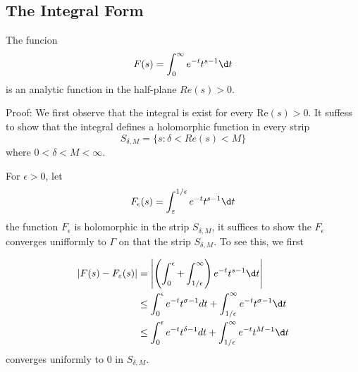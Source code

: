 \documentclass[12pt, oneside]{book}
\begin{document}
\subsection{The Integral Form}
\begin{lemma}
    The funcion
    $$
        F(s)
        =
        \int_0^\infty e^{-t}t^{s-1}\d t
    $$
    is an analytic function in the half-plane $Re(s)>0$.

    Proof:
    We first observe that the integral is exist for every
    $\mathrm{Re}(s) > 0$.
    It suffess to show that the integral defines a holomorphic function in every strip
    $$S_{\delta,M}=\{s:\delta<{Re}(s)<M\}$$
    where $0<\delta<M<\infty$.

    For $\epsilon>0$, let
    $$F_{\epsilon}(s)=\int_{\varepsilon}^{1/\epsilon}e^{-t}t^{s-1}\d t$$
    the function $F_{\epsilon}$ is holomorphic in the strip $S_{\delta,M}$, it suffices to show the
    $F_{\epsilon}$ converges unifformly to $\Gamma$ on that the strip $S_{\delta,M}$. To see this, we first

    $$\begin{aligned}
            \left|F(s)-F_\varepsilon(s)\right| &
            =\left|\left(\int_0^\epsilon+\int_{1/\epsilon}^\infty\right)e^{-t}t^{s-1}\d t\right|                                          \\
                                               & \leq\int_0^\epsilon e^{-t}t^{\sigma-1}dt+\int_{1/\epsilon}^\infty e^{-t}t^{\sigma-1}\d t \\
                                               & \leq\int_0^\epsilon e^{-t}t^{\delta-1}dt+\int_{1/\epsilon}^\infty e^{-t}t^{M-1}\d t      \\
        \end{aligned}$$
    converges uniformly to $0$ in $S_{\delta,M}$.
\end{lemma}
\end{document}
